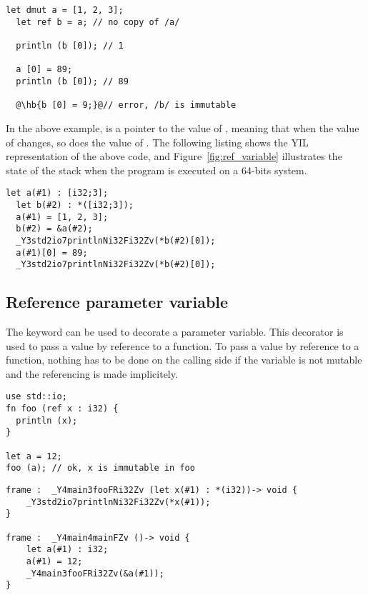 \begin{lstlisting}[style=coloredverbatim, escapechar=@]
  let dmut a = [1, 2, 3];
  let ref b = a; // no copy of /a/

  println (b [0]); // 1

  a [0] = 89;
  println (b [0]); // 89

  @\hb{b [0] = 9;}@// error, /b/ is immutable
\end{lstlisting}

In the above example,  is a pointer to the value of ,
meaning that when the value of  changes, so does the value of
. The following listing shows the YIL representation of the above
code, and Figure~\ref{fig:ref_variable} illustrates the state of the stack when the
program is executed on a 64-bits system.

\begin{lstlisting}[style=intermediateVerb]
  let a(#1) : [i32;3];
  let b(#2) : *([i32;3]);
  a(#1) = [1, 2, 3];
  b(#2) = &a(#2);
  _Y3std2io7printlnNi32Fi32Zv(*b(#2)[0]);
  a(#1)[0] = 89;
  _Y3std2io7printlnNi32Fi32Zv(*b(#2)[0]);
\end{lstlisting}



\subsection{Reference parameter variable}
\label{sec:ref_param}

The  keyword can be used to decorate a parameter variable. This
decorator is used to pass a value by reference to a function. To pass a value by
reference to a function, nothing has to be done on the calling side if the
variable is not mutable and the referencing is made implicitely.

\begin{lstlisting}[style=coloredverbatim]
use std::io;
fn foo (ref x : i32) {
  println (x);
}

let a = 12;
foo (a); // ok, x is immutable in foo
\end{lstlisting}

\begin{lstlisting}[style=intermediateVerb]
frame :  _Y4main3fooFRi32Zv (let x(#1) : *(i32))-> void {
    _Y3std2io7printlnNi32Fi32Zv(*x(#1));
}

frame :  _Y4main4mainFZv ()-> void {
    let a(#1) : i32;
    a(#1) = 12;
    _Y4main3fooFRi32Zv(&a(#1));
}
\end{lstlisting}

